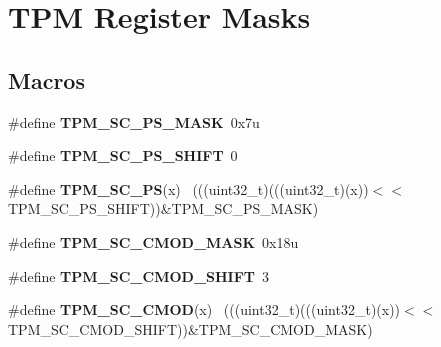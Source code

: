 \hypertarget{group___t_p_m___register___masks}{}\section{T\+P\+M Register Masks}
\label{group___t_p_m___register___masks}
\subsection*{Macros}
\begin{DoxyCompactItemize}
\item 
\hypertarget{group___t_p_m___register___masks_gab20218cf8b49b4d2aa932cfafdf5a43e}{}\#define {\bfseries T\+P\+M\+\_\+\+S\+C\+\_\+\+P\+S\+\_\+\+M\+A\+S\+K}~0x7u\label{group___t_p_m___register___masks_gab20218cf8b49b4d2aa932cfafdf5a43e}

\item 
\hypertarget{group___t_p_m___register___masks_ga13fca37c98cc93640be8ed1733cb9805}{}\#define {\bfseries T\+P\+M\+\_\+\+S\+C\+\_\+\+P\+S\+\_\+\+S\+H\+I\+F\+T}~0\label{group___t_p_m___register___masks_ga13fca37c98cc93640be8ed1733cb9805}

\item 
\hypertarget{group___t_p_m___register___masks_ga520f51b687e2457fbf2db626afef1038}{}\#define {\bfseries T\+P\+M\+\_\+\+S\+C\+\_\+\+P\+S}(x)                                                      ~(((uint32\+\_\+t)(((uint32\+\_\+t)(x))$<$$<$T\+P\+M\+\_\+\+S\+C\+\_\+\+P\+S\+\_\+\+S\+H\+I\+F\+T))\&T\+P\+M\+\_\+\+S\+C\+\_\+\+P\+S\+\_\+\+M\+A\+S\+K)\label{group___t_p_m___register___masks_ga520f51b687e2457fbf2db626afef1038}

\item 
\hypertarget{group___t_p_m___register___masks_ga86346adaa1aec83adbcf3a21289d6400}{}\#define {\bfseries T\+P\+M\+\_\+\+S\+C\+\_\+\+C\+M\+O\+D\+\_\+\+M\+A\+S\+K}~0x18u\label{group___t_p_m___register___masks_ga86346adaa1aec83adbcf3a21289d6400}

\item 
\hypertarget{group___t_p_m___register___masks_ga9268286302a41feb004444a7b368af69}{}\#define {\bfseries T\+P\+M\+\_\+\+S\+C\+\_\+\+C\+M\+O\+D\+\_\+\+S\+H\+I\+F\+T}~3\label{group___t_p_m___register___masks_ga9268286302a41feb004444a7b368af69}

\item 
\hypertarget{group___t_p_m___register___masks_ga4a1a5d928f676c977e8e74be89762f59}{}\#define {\bfseries T\+P\+M\+\_\+\+S\+C\+\_\+\+C\+M\+O\+D}(x)                                                  ~(((uint32\+\_\+t)(((uint32\+\_\+t)(x))$<$$<$T\+P\+M\+\_\+\+S\+C\+\_\+\+C\+M\+O\+D\+\_\+\+S\+H\+I\+F\+T))\&T\+P\+M\+\_\+\+S\+C\+\_\+\+C\+M\+O\+D\+\_\+\+M\+A\+S\+K)\label{group___t_p_m___register___masks_ga4a1a5d928f676c977e8e74be89762f59}


\end{DoxyCompactItemize}
